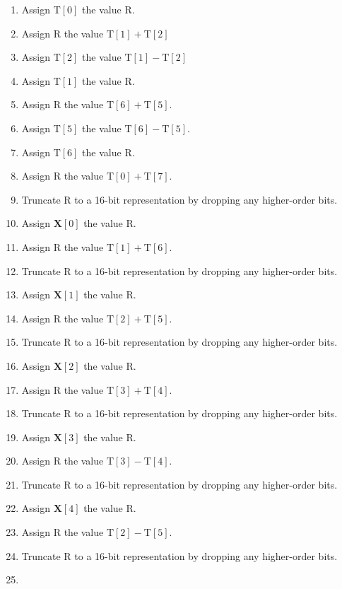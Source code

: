 \documentclass[9pt,letterpaper]{book}
\newcommand{\bitvar}[1]{\ensuremath{\mathbf{\bm{#1}}}}
\newcommand{\locvar}[1]{\ensuremath{\mathrm{#1}}}
\numberwithin{equation}{chapter}
\numberwithin{figure}{chapter}
\numberwithin{table}{chapter}
\begin{document}
\begin{enumerate}
\item
Assign $\locvar{T}[0]$ the value \locvar{R}.
\item
Assign \locvar{R} the value $\locvar{T}[1]+\locvar{T}[2]$
\item
Assign $\locvar{T}[2]$ the value $\locvar{T}[1]-\locvar{T}[2]$
\item
Assign $\locvar{T}[1]$ the value \locvar{R}.
\item
Assign \locvar{R} the value $\locvar{T}[6]+\locvar{T}[5]$.
\item
Assign $\locvar{T}[5]$ the value $\locvar{T}[6]-\locvar{T}[5]$.
\item
Assign $\locvar{T}[6]$ the value \locvar{R}.
\item
Assign \locvar{R} the value $\locvar{T}[0]+\locvar{T}[7]$.
\item
Truncate \locvar{R} to a 16-bit representation by dropping any higher-order
 bits.
\item
Assign $\bitvar{X}[0]$ the value \locvar{R}.
\item
Assign \locvar{R} the value $\locvar{T}[1]+\locvar{T}[6]$.
\item
Truncate \locvar{R} to a 16-bit representation by dropping any higher-order
 bits.
\item
Assign $\bitvar{X}[1]$ the value \locvar{R}.
\item
Assign \locvar{R} the value $\locvar{T}[2]+\locvar{T}[5]$.
\item
Truncate \locvar{R} to a 16-bit representation by dropping any higher-order
 bits.
\item
Assign $\bitvar{X}[2]$ the value \locvar{R}.
\item
Assign \locvar{R} the value $\locvar{T}[3]+\locvar{T}[4]$.
\item
Truncate \locvar{R} to a 16-bit representation by dropping any higher-order
 bits.
\item
Assign $\bitvar{X}[3]$ the value \locvar{R}.
\item
Assign \locvar{R} the value $\locvar{T}[3]-\locvar{T}[4]$.
\item
Truncate \locvar{R} to a 16-bit representation by dropping any higher-order
 bits.
\item
Assign $\bitvar{X}[4]$ the value \locvar{R}.
\item
Assign \locvar{R} the value $\locvar{T}[2]-\locvar{T}[5]$.
\item
Truncate \locvar{R} to a 16-bit representation by dropping any higher-order
 bits.
\item

\end{enumerate}
\end{document}
